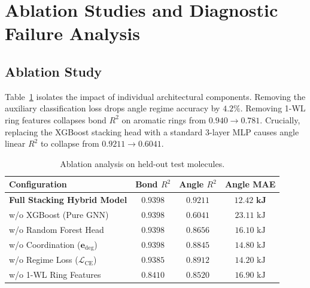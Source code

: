 \documentclass[11pt,a4paper]{article}
\begin{document}
\section{Ablation Studies and Diagnostic Failure Analysis}
\label{sec:ablation}

\subsection{Ablation Study}
Table~\ref{tab:ablation} isolates the impact of individual architectural components. Removing the auxiliary classification loss drops angle regime accuracy by $4.2\%$. Removing 1-WL ring features collapses bond $R^2$ on aromatic rings from $0.940 \to 0.781$. Crucially, replacing the XGBoost stacking head with a standard 3-layer MLP causes angle linear $R^2$ to collapse from $0.9211 \to 0.6041$.

\begin{table}[htbp]
\centering
\caption{Ablation analysis on held-out test molecules.}
\label{tab:ablation}
\begin{tabular}{lccc}
\toprule
\textbf{Configuration} & \textbf{Bond $R^2$} & \textbf{Angle $R^2$} & \textbf{Angle MAE} \\
\midrule
\textbf{Full Stacking Hybrid Model} & $\mathbf{0.9398}$ & $\mathbf{0.9211}$ & $\mathbf{12.42\text{ kJ}}$ \\
\quad w/o XGBoost (Pure GNN) & $0.9398$ & $0.6041$ & $23.11\text{ kJ}$ \\
\quad w/o Random Forest Head & $0.9398$ & $0.8656$ & $16.10\text{ kJ}$ \\
\quad w/o Coordination ($\mathbf{e}_{\text{deg}}$) & $0.9398$ & $0.8845$ & $14.80\text{ kJ}$ \\
\quad w/o Regime Loss ($\mathcal{L}_{\text{CE}}$) & $0.9385$ & $0.8912$ & $14.20\text{ kJ}$ \\
\quad w/o 1-WL Ring Features & $0.8410$ & $0.8520$ & $16.90\text{ kJ}$ \\
\bottomrule
\end{tabular}
\end{table}
\end{document}

